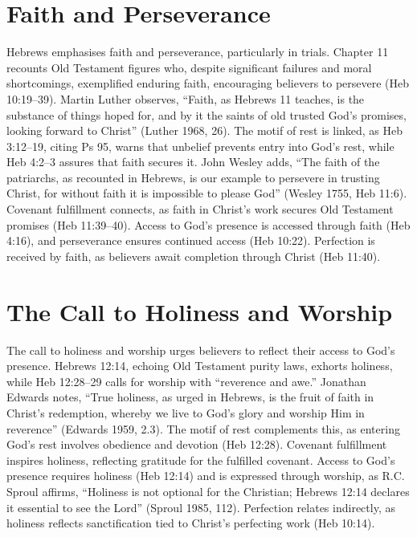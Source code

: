 \documentclass[12pt]{article}
\begin{document}
\section{Faith and Perseverance}
Hebrews emphasises faith and perseverance, particularly in trials. Chapter 11
recounts Old Testament figures who, despite significant failures and moral
shortcomings, exemplified enduring faith, encouraging believers to persevere
(Heb 10:19--39). Martin Luther observes, ``Faith, as Hebrews 11 teaches, is the
substance of things hoped for, and by it the saints of old trusted God’s
promises, looking forward to Christ'' (Luther 1968, 26). The motif of rest is
linked, as Heb 3:12--19, citing Ps 95, warns that unbelief prevents entry into
God’s rest, while Heb 4:2--3 assures that faith secures it. John Wesley adds,
``The faith of the patriarchs, as recounted in Hebrews, is our example to
persevere in trusting Christ, for without faith it is impossible to please
God'' (Wesley 1755, Heb 11:6). Covenant fulfillment connects, as faith in
Christ’s work secures Old Testament promises (Heb 11:39--40). Access to God’s
presence is accessed through faith (Heb 4:16), and perseverance ensures
continued access (Heb 10:22). Perfection is received by faith, as believers
await completion through Christ (Heb 11:40).

\section{The Call to Holiness and Worship}
The call to holiness and worship urges believers to reflect their access to
God’s presence. Hebrews 12:14, echoing Old Testament purity laws, exhorts
holiness, while Heb 12:28--29 calls for worship with ``reverence and awe.''
Jonathan Edwards notes, ``True holiness, as urged in Hebrews, is the fruit of
faith in Christ’s redemption, whereby we live to God’s glory and worship Him in
reverence'' (Edwards 1959, 2.3). The motif of rest complements this, as
entering God’s rest involves obedience and devotion (Heb 12:28). Covenant
fulfillment inspires holiness, reflecting gratitude for the fulfilled covenant.
Access to God’s presence requires holiness (Heb 12:14) and is expressed through
worship, as R.C. Sproul affirms, ``Holiness is not optional for the Christian;
Hebrews 12:14 declares it essential to see the Lord'' (Sproul 1985, 112).
Perfection relates indirectly, as holiness reflects sanctification tied to
Christ’s perfecting work (Heb 10:14).
\end{document}
